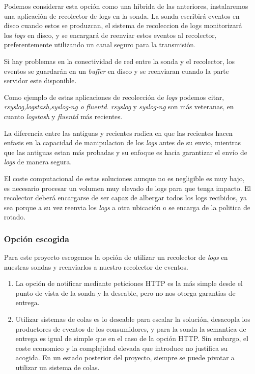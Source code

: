 Podemos considerar esta opción como una hibrida de las anteriores, instalaremos una aplicación de recolector de logs en la sonda. 
La sonda escribirá eventos en disco cuando estos se produzcan, el sistema de recoleccion de logs monitorizará los \emph{logs} en disco, y
se encargará de reenviar estos eventos al recolector, preferentemente utilizando un canal seguro para la transmisión.

Si hay problemas en la conectividad de red entre la sonda y el recolector, los eventos se guardarán en un \emph{buffer} en disco y se reenviaran cuando la parte servidor este disponible.

Como ejemplo de estas aplicaciones de recolección de \emph{logs} podemos citar, \emph{rsyslog,logstash,syslog-ng o fluentd}. \emph{rsyslog} y \emph{syslog-ng} son más veteranas, 
en cuanto \emph{logstash} y \emph{fluentd} más recientes. 

La diferencia entre las antiguas y recientes radica en que las recientes hacen enfasis en la capacidad de manipulacion de los \emph{logs} antes de su envio, mientras
que las antiguas estan más probadas y su enfoque es hacia garantizar el envío de \emph{logs} de manera segura.

El coste computacional de estas soluciones aunque no es negligible es muy bajo, es necesario procesar un volumen muy elevado de logs para que tenga impacto.
El recolector deberá encargarse de ser capaz de albergar todos los logs recibidos, ya sea porque a su vez reenvia los \emph{logs} a otra ubicación o se encarga de la 
politica de rotado. 

\subsubsection{Opción escogida}

Para este proyecto escogemos la opción de utilizar un recolector de \emph{logs} en nuestras sondas y reenviarlos a nuestro recolector de eventos. 

\begin{enumerate}
    \item La opción de notificar mediante peticiones HTTP es la más simple desde el punto de vista de la sonda y la deseable, pero no nos otorga garantias de entrega.
    \item Utilizar sistemas de colas es lo deseable para escalar la solución, desacopla los productores de eventos de los consumidores,
     y para la sonda la semantica de entrega es igual de simple que en el caso de la opción HTTP. Sin embargo, el coste economico y la complejidad elevada que introduce no justifica su acogida.
     En un estado posterior del proyecto, siempre se puede pivotar a utilizar un sistema de colas.
\end{enumerate}

